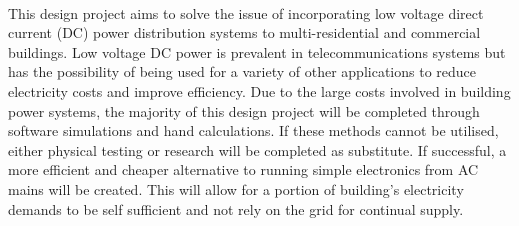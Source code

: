 \paragraph{}
This design project aims to solve the issue of incorporating low voltage direct current (DC) power distribution systems to multi-residential and commercial buildings. Low voltage DC power is prevalent in telecommunications systems but has the possibility of being used for a variety of other applications to reduce electricity costs and improve efficiency. Due to the large costs involved in building power systems, the majority of this design project will be completed through software simulations and hand calculations. If these methods cannot be utilised, either physical testing or research will be completed as substitute. If successful, a more efficient and cheaper alternative to running simple electronics from AC mains will be created. This will allow for a portion of building's electricity demands to be self sufficient and not rely on the grid for continual supply.   
 
\newpage

